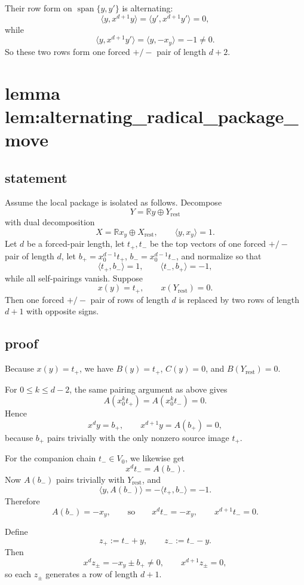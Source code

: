 \documentclass[
]{article}
\begin{document}
Their row form on \(\operatorname{span}\{y,y'\}\) is alternating: \[
\langle y,x^{d+1}y\rangle=\langle y',x^{d+1}y'\rangle=0,
\] while \[
\langle y,x^{d+1}y'\rangle=\langle y,-x_y\rangle=-1\neq 0.
\] So these two rows form one forced \(+/-\) pair of length \(d+2\).

\section{lemma
lem:alternating\_radical\_package\_move}\label{lemma-lemalternating_radical_package_move}

\subsection{statement}\label{statement-8}

Assume the local package is isolated as follows. Decompose \[
Y=\mathbb R y\oplus Y_{\mathrm{rest}}
\] with dual decomposition \[
X=\mathbb R x_y\oplus X_{\mathrm{rest}},
\qquad
\langle y,x_y\rangle=1.
\] Let \(d\) be a forced-pair length, let \(t_+,t_-\) be the top vectors
of one forced \(+/-\) pair of length \(d\), let \(b_+=x_0^{d-1}t_+\),
\(b_-=x_0^{d-1}t_-\), and normalize so that \[
\langle t_+,b_-\rangle=1,\qquad \langle t_-,b_+\rangle=-1,
\] while all self-pairings vanish. Suppose \[
x(y)=t_+,\qquad x(Y_{\mathrm{rest}})=0.
\] Then one forced \(+/-\) pair of rows of length \(d\) is replaced by
two rows of length \(d+1\) with opposite signs.

\subsection{proof}\label{proof-8}

Because \(x(y)=t_+\), we have \(B(y)=t_+\), \(C(y)=0\), and
\(B(Y_{\mathrm{rest}})=0\).

For \(0\le k\le d-2\), the same pairing argument as above gives \[
A(x_0^k t_+)=A(x_0^k t_-)=0.
\] Hence \[
x^d y=b_+,\qquad x^{d+1}y=A(b_+)=0,
\] because \(b_+\) pairs trivially with the only nonzero source image
\(t_+\).

For the companion chain \(t_-\in V_0\), we likewise get \[
x^d t_-=A(b_-).
\] Now \(A(b_-)\) pairs trivially with \(Y_{\mathrm{rest}}\), and \[
\langle y,A(b_-)\rangle=-\langle t_+,b_-\rangle=-1.
\] Therefore \[
A(b_-)=-x_y,
\qquad\text{so}\qquad
x^d t_-=-x_y,\qquad x^{d+1}t_-=0.
\]

Define \[
z_+:=t_-+y,\qquad z_-:=t_--y.
\] Then \[
x^d z_\pm=-x_y\pm b_+\neq 0,\qquad x^{d+1}z_\pm=0,
\] so each \(z_\pm\) generates a row of length \(d+1\).
\end{document}
